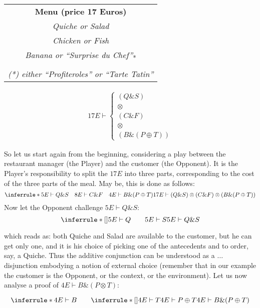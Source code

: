 \documentclass[acmsmall,screen, nonacm, anonymous]{acmart}
\begin{document}
\begin{minipage}{0.45\linewidth}
  \begin{tabular}{c}
    \textbf{Menu (price 17 Euros)}\\
    \textit{Quiche or Salad}\\
    \textit{Chicken or Fish}\\
    \textit{Banana or \enquote{Surprise du Chef}}\textsubscript{*}\\
    {}\\
    \textit{(*) either \enquote{Profiteroles} or \enquote{Tarte Tatin}}


  \end{tabular}
\end{minipage}
\hfill
\begin{minipage}{0.45\linewidth}
  \[
  \begin{aligned}
  17E \vdash 
  \left\{ \begin{array}{c}
    (Q \& S)\\
    \otimes\\
    (C \& F)\\
    \otimes\\
    (B \& (P \oplus T))
  \end{array}
  \right.
\end{aligned}
  \]
\end{minipage}

So let us start again from the beginning, considering a play between the restaurant manager (the Player) and the customer (the Opponent). 
It is the Player's responsibility to split the $17E$ into three parts, corresponding to the cost of the three parts of the meal. 
May be, this is done as follows:
\[
\inferrule*{5E \vdash Q \& S \quad 8E \vdash C \& F \quad 4E \vdash B \& (P \oplus T)}{17E \vdash (Q \& S) \otimes (C \& F) \otimes (B \& (P \oplus T))}
\]
Now let the Opponent challenge $5E \vdash Q \& S$:
\[
\inferrule*[]{5E \vdash Q \qquad 5E \vdash S}{5E \vdash Q \& S}
\]

which reads as: both Quiche and Salad are available to the customer, but he can get only one, and it is his choice of picking one of the antecedents and to order, say, a Quiche. 
Thus the additive conjunction can be understood as a $\ldots$ disjunction embodying a notion of external choice (remember that in our example the customer is the Opponent, or the context, or the environment). 
Let us now analyse a proof of $4E \vdash B \& (P \otimes T)$:

\[
\inferrule*{4E \vdash B  \qquad \inferrule*[]{4E \vdash T}{4E \vdash P \oplus T}}{4E \vdash B \& (P \oplus T)}
\]
\end{document}
